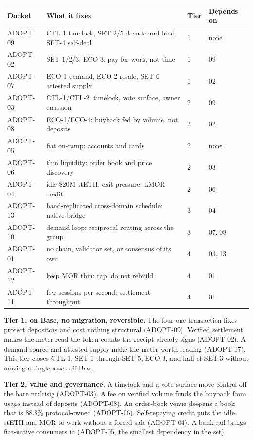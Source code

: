 \documentclass[11pt,a4paper]{article}
\begin{document}
\begin{center}\small
\begin{tabular}{@{}llll@{}}
\toprule
\textbf{Docket} & \textbf{What it fixes} & \textbf{Tier} & \textbf{Depends on} \\
\midrule
ADOPT-09 & CTL-1 timelock, SET-2/5 decode and bind, SET-4 self-deal & 1 & none \\
ADOPT-02 & SET-1/2/3, ECO-3: pay for work, not time & 1 & 09 \\
ADOPT-07 & ECO-1 demand, ECO-2 resale, SET-6 attested supply & 1 & 02 \\
\midrule
ADOPT-03 & CTL-1/CTL-2: timelock, vote surface, owner emission & 2 & 09 \\
ADOPT-08 & ECO-1/ECO-4: buyback fed by volume, not deposits & 2 & 02 \\
ADOPT-05 & fiat on-ramp: accounts and cards & 2 & none \\
ADOPT-06 & thin liquidity: order book and price discovery & 2 & 03 \\
ADOPT-04 & idle \$20M stETH, exit pressure: LMOR credit & 2 & 06 \\
\midrule
ADOPT-13 & hand-replicated cross-domain schedule: native bridge & 3 & 04 \\
ADOPT-10 & demand loop: reciprocal routing across the group & 3 & 07, 08 \\
\midrule
ADOPT-01 & no chain, validator set, or consensus of its own & 4 & 03, 13 \\
ADOPT-12 & keep MOR thin: tap, do not rebuild & 4 & 01 \\
ADOPT-11 & few sessions per second: settlement throughput & 4 & 01 \\
\bottomrule
\end{tabular}
\end{center}

\textbf{Tier 1, on Base, no migration, reversible.} The four one-transaction fixes protect
depositors and cost nothing structural (ADOPT-09). Verified settlement makes the meter read the
token counts the receipt already signs (ADOPT-02). A demand source and attested supply make the
meter worth reading (ADOPT-07). This tier closes CTL-1, SET-1 through SET-5, ECO-3, and half of
SET-3 without moving a single asset off Base.

\textbf{Tier 2, value and governance.} A timelock and a vote surface move control off the bare
multisig (ADOPT-03). A fee on verified volume funds the buyback from usage instead of deposits
(ADOPT-08). An order-book venue deepens a book that is 88.8\% protocol-owned (ADOPT-06).
Self-repaying credit puts the idle stETH and MOR to work without a forced sale (ADOPT-04). A
bank rail brings fiat-native consumers in (ADOPT-05, the smallest dependency in the set).
\end{document}
